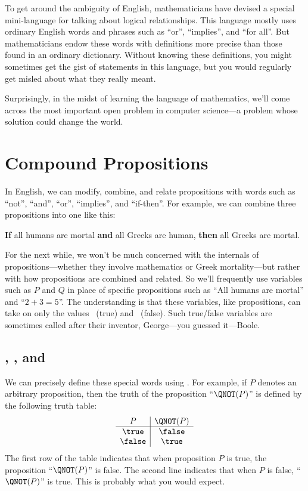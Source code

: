 To get around the ambiguity of English, mathematicians have devised a
special mini-language for talking about logical relationships.  This
language mostly uses ordinary English words and phrases such as ``or'',
``implies'', and ``for all''.  But mathematicians endow these words with
definitions more precise than those found in an ordinary dictionary.
Without knowing these definitions, you might sometimes get the gist of
statements in this language, but you would regularly get misled about what
they really meant.

Surprisingly, in the midst of learning the language of mathematics, we'll
come across the most important open problem in computer science---a
problem whose solution could change the world.

\section{Compound Propositions}

In English, we can modify, combine, and relate propositions with words
such as ``not'', ``and'', ``or'', ``implies'', and ``if-then''.
For example, we can combine three propositions into one like this:
%
\begin{center}
\textbf{If} all humans are mortal \textbf{and} all Greeks are human,
\textbf{then} all Greeks are mortal.
\end{center}

For the next while, we won't be much concerned with the internals of
propositions---whether they involve mathematics or Greek mortality---but
rather with how propositions are combined and related.  So we'll
frequently use variables such as $P$ and $Q$ in place of specific
propositions such as ``All humans are mortal'' and ``$2 + 3 = 5$''.  The
understanding is that these variables, like propositions, can take on only
the values \true ~(true) and \false ~(false).  Such true/false variables are
sometimes called  after their inventor,
George---you guessed it---Boole. 

\subsection{\QNOT, \QAND, and \QOR}

We can precisely define these special words using .
For example, if $P$ denotes an arbitrary proposition, then the
truth of the proposition ``$\QNOT(P)$'' is defined by the following
truth table:
%
\[
\begin{array}{c|c}
P & \QNOT(P) \\ \hline
\true & \false \\
\false & \true \\
\end{array}
\]
%
The first row of the table indicates that when proposition $P$ is true,
the proposition ``$\QNOT(P)$'' is false.  The second line indicates that
when $P$ is false, ``$\QNOT(P)$'' is true.  This is probably what you would
expect.

